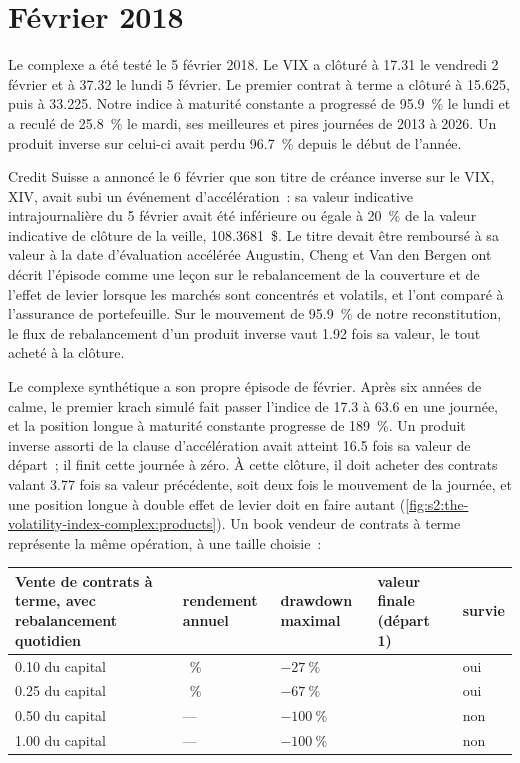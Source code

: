 \section{Février 2018}

Le complexe a été testé le 5 février 2018. Le VIX a clôturé à 17.31 le vendredi 2 février et à 37.32 le lundi 5 février. Le premier contrat à terme a clôturé à
15.625, puis à 33.225. Notre indice à maturité constante a progressé de 95.9~\% le lundi et a reculé de 25.8~\% le mardi, ses meilleures et pires journées de 2013 à 2026. Un
produit inverse sur celui-ci avait perdu 96.7~\% depuis le début de l'année.

Credit Suisse a annoncé le 6 février que son titre de créance inverse sur le VIX, XIV, avait subi un événement d'accélération~: sa valeur indicative intrajournalière du 5 février
avait été inférieure ou égale à 20~\% de la valeur indicative de clôture de la veille, 108.3681~\$. Le titre devait être remboursé à sa valeur à la date d'évaluation accélérée
Augustin, Cheng et Van den Bergen ont décrit l'épisode comme une leçon sur le rebalancement de la couverture et de l'effet de levier lorsque les marchés sont concentrés
et volatils, et l'ont comparé à l'assurance de portefeuille. Sur le mouvement de 95.9~\% de notre reconstitution, le flux de rebalancement d'un produit inverse vaut 1.92 fois sa valeur, le tout
acheté à la clôture.

Le complexe synthétique a son propre épisode de février. Après six années de calme, le premier krach simulé fait passer l'indice de 17.3 à 63.6 en une journée, et la position longue
à maturité constante progresse de 189~\%. Un produit inverse assorti de la clause d'accélération avait atteint 16.5 fois sa valeur de départ~; il finit cette journée à
zéro. À cette clôture, il doit acheter des contrats valant 3.77 fois sa valeur précédente, soit deux fois le mouvement de la journée, et une position longue à double effet de levier doit en faire autant
(\cref{fig:s2:the-volatility-index-complex:products}). Un book vendeur de contrats à terme représente la même opération, à une taille choisie~:

\begin{center}
\small
\begin{tabular}{@{}p{5.2cm}>{\centering\arraybackslash}p{2.3cm}>{\centering\arraybackslash}p{2.3cm}>{\centering\arraybackslash}p{2.3cm}>{\centering\arraybackslash}p{2.3cm}@{}}
\toprule
Vente de contrats à terme, avec rebalancement quotidien & rendement annuel & drawdown maximal & valeur finale (départ 1) & survie\\
\midrule
0.10 du capital & 4.8~\% & $-27~\%$ & 2.57 & oui\\
0.25 du capital & 9.6~\% & $-67~\%$ & 6.26 & oui\\
0.50 du capital & --- & $-100~\%$ & 0 & non\\
1.00 du capital & --- & $-100~\%$ & 0 & non\\
\bottomrule
\end{tabular}
\end{center}

